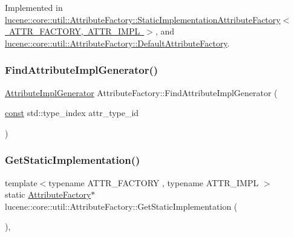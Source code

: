 Implemented in \mbox{\hyperlink{classlucene_1_1core_1_1util_1_1AttributeFactory_1_1StaticImplementationAttributeFactory_a06466469f2cf37e0ef599e617d415c6a}{lucene\+::core\+::util\+::\+Attribute\+Factory\+::\+Static\+Implementation\+Attribute\+Factory$<$ A\+T\+T\+R\+\_\+\+F\+A\+C\+T\+O\+R\+Y, A\+T\+T\+R\+\_\+\+I\+M\+P\+L $>$}}, and \mbox{\hyperlink{classlucene_1_1core_1_1util_1_1AttributeFactory_1_1DefaultAttributeFactory_af9b68def67fc7995d2c5e9f3d1560f5e}{lucene\+::core\+::util\+::\+Attribute\+Factory\+::\+Default\+Attribute\+Factory}}.

\mbox{\label{classlucene_1_1core_1_1util_1_1AttributeFactory_af56838e41c83a10b00063e02c3f910e6}} 
\subsubsection{\texorpdfstring{Find\+Attribute\+Impl\+Generator()}{FindAttributeImplGenerator()}}
{\footnotesize\ttfamily \mbox{\hyperlink{namespacelucene_1_1core_1_1util_acbd8821be7d7b29749374e57b0a7c40b}{Attribute\+Impl\+Generator}} Attribute\+Factory\+::\+Find\+Attribute\+Impl\+Generator (\begin{DoxyParamCaption}\item[{\mbox{\hyperlink{ZlibCrc32_8h_a2c212835823e3c54a8ab6d95c652660e}{const}} std\+::type\+\_\+index}]{attr\+\_\+type\+\_\+id }\end{DoxyParamCaption})\hspace{0.3cm}{\ttfamily [static]}}

\mbox{\label{classlucene_1_1core_1_1util_1_1AttributeFactory_ac770bcd808b70e6d1d5f8a3c6cd8150d}} 
\subsubsection{\texorpdfstring{Get\+Static\+Implementation()}{GetStaticImplementation()}}
{\footnotesize\ttfamily template$<$typename A\+T\+T\+R\+\_\+\+F\+A\+C\+T\+O\+RY , typename A\+T\+T\+R\+\_\+\+I\+M\+PL $>$ \\
static \mbox{\hyperlink{classlucene_1_1core_1_1util_1_1AttributeFactory}{Attribute\+Factory}}$\ast$ lucene\+::core\+::util\+::\+Attribute\+Factory\+::\+Get\+Static\+Implementation (\begin{DoxyParamCaption}{ }\end{DoxyParamCaption})\hspace{0.3cm}{\ttfamily [inline]}, {\ttfamily [static]}}

